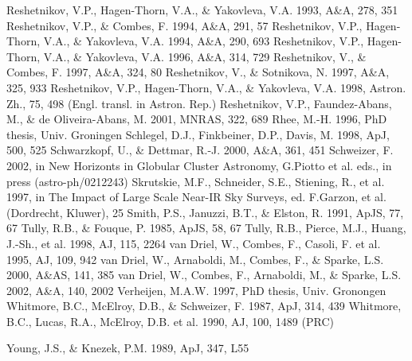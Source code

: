 \documentclass[]{aa}
\begin{document}
\begin{thebibliography}{}
\bibitem{} Reshetnikov, V.P., Hagen-Thorn, V.A., \& Yakovleva, V.A.
1993, A\&A, 278, 351
\bibitem{} Reshetnikov, V.P., \& Combes, F. 1994, A\&A, 291, 57
\bibitem{} Reshetnikov, V.P., Hagen-Thorn, V.A., \& Yakovleva, V.A.
1994, A\&A, 290, 693
\bibitem{} Reshetnikov, V.P., Hagen-Thorn, V.A., \& Yakovleva, V.A.
1996, A\&A, 314, 729
\bibitem{} Reshetnikov, V., \& Combes, F. 1997, A\&A, 324, 80
\bibitem{} Reshetnikov, V., \& Sotnikova, N. 1997, A\&A, 325, 933
\bibitem{} Reshetnikov, V.P., Hagen-Thorn, V.A., \& Yakovleva, V.A. 1998,
Astron. Zh., 75, 498 (Engl. transl. in Astron. Rep.)
\bibitem{} Reshetnikov, V.P., Faundez-Abans, M., \& de Oliveira-Abans, M.
2001, MNRAS, 322, 689
\bibitem{} Rhee, M.-H. 1996, PhD thesis, Univ. Groningen
\bibitem{} Schlegel, D.J., Finkbeiner, D.P., Davis, M. 1998,
ApJ, 500, 525
\bibitem{} Schwarzkopf, U., \& Dettmar, R.-J. 2000, A\&A, 361, 451 
\bibitem{} Schweizer, F. 2002, in New Horizonts in Globular Cluster
Astronomy, G.Piotto et al. eds., in press (astro-ph/0212243)
\bibitem{} Skrutskie, M.F., Schneider, S.E., Stiening, R., et al. 1997,
in The Impact of Large Scale Near-IR Sky Surveys, ed. F.Garzon, et al.
(Dordrecht, Kluwer), 25
\bibitem{} Smith, P.S., Januzzi, B.T., \& Elston, R. 1991, ApJS, 77, 67
\bibitem{} Tully, R.B., \& Fouque, P. 1985, ApJS, 58, 67
\bibitem{} Tully, R.B., Pierce, M.J., Huang, J.-Sh., et al. 1998,
AJ, 115, 2264
\bibitem{} van Driel, W., Combes, F., Casoli, F. et al. 1995, AJ, 109, 942
\bibitem{} van Driel, W., Arnaboldi, M., Combes, F., \& Sparke, L.S.
2000, A\&AS, 141, 385
\bibitem{} van Driel, W., Combes, F., Arnaboldi, M., \& Sparke, L.S.
2002, A\&A, 140, 2002
\bibitem{} Verheijen, M.A.W. 1997, PhD thesis, Univ. Gronongen
\bibitem{} Whitmore, B.C., McElroy, D.B., \& Schweizer, F. 1987,
ApJ, 314, 439
\bibitem{} Whitmore, B.C., Lucas, R.A., McElroy, D.B. et al. 1990,
AJ, 100, 1489
 (PRC)

\bibitem{} Young, J.S., \& Knezek, P.M. 1989, ApJ, 347, L55

\end{thebibliography}

\end{document}
